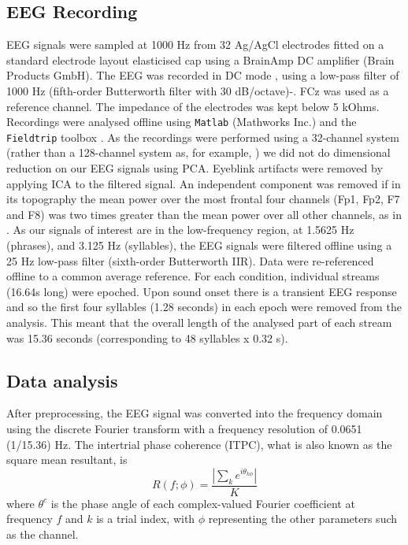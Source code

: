 \documentclass[10pt,letterpaper]{article}
\newcommand{\citet}[1]{\cite{#1}}
\begin{document}
\subsection*{EEG Recording}
 
EEG signals were sampled at 1000 Hz from 32 Ag/AgCl electrodes fitted
on a standard electrode layout elasticised cap using a BrainAmp DC
amplifier (Brain Products GmbH). The EEG was recorded in DC mode ,
using a low-pass filter of 1000 Hz (fifth-order Butterworth filter
with 30 dB/octave)-. FCz was used as a reference channel. The
impedance of the electrodes was kept below 5 kOhms. Recordings were
analysed offline using \texttt{Matlab} (Mathworks Inc.) and the
\texttt{Fieldtrip} toolbox \cite{FieldTrip}. As the recordings were
performed using a 32-channel system (rather than a 128-channel system
as, for example, \citet{DingEtAl2017}) we did not do dimensional
reduction on our EEG signals using PCA. Eyeblink artifacts were
removed by applying ICA to the filtered signal. An independent
component was removed if in its topography the mean power over the
most frontal four channels (Fp1, Fp2, F7 and F8) was two times greater
than the mean power over all other channels, as in
\citet{DingEtAl2017}. As our signals of interest are in the
low-frequency region, at 1.5625 Hz (phrases), and 3.125 Hz
(syllables), the EEG signals were filtered offline using a 25 Hz
low-pass filter (sixth-order Butterworth IIR). Data were re-referenced
offline to a common average reference. For each condition, individual
streams (16.64s long) were epoched. Upon sound onset there is a
transient EEG response and so the first four syllables (1.28 seconds)
in each epoch were removed from the analysis. This meant that the
overall length of the analysed part of each stream was 15.36 seconds
(corresponding to 48 syllables x 0.32 s).

\subsection*{Data analysis}

After preprocessing, the EEG signal was converted into the frequency
domain using the discrete Fourier transform with a frequency
resolution of 0.0651 (1/15.36) Hz. The intertrial phase coherence
(ITPC), what is also known as the square mean resultant, is
\begin{equation}
\label{eq:itpc}
R(f;\phi)=\frac{\left|\sum_k e^{i\theta_{k\phi}}\right|}{K}
\end{equation}
where $\theta^c$ is the phase angle of each complex-valued Fourier
coefficient at frequency $f$ and $k$ is a trial index, with $\phi$
representing the other parameters such as the channel.
\end{document}
